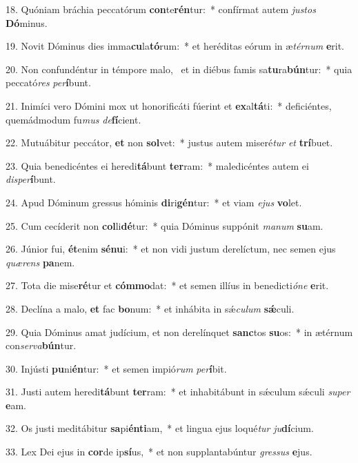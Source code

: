 18. Quóniam bráchia peccatórum \textbf{con}te\textbf{rén}tur:~*  confírmat autem \textit{jus}\textit{tos} \textbf{Dó}minus.\

19. Novit Dóminus dies imma\textbf{cu}la\textbf{tó}rum:~*  et heréditas eórum in æ\textit{tér}\textit{num} \textbf{e}rit.\

20. Non confundéntur in témpore malo, \dag\  et in diébus famis sa\textbf{tu}ra\textbf{bún}tur:~*  quia peccató\textit{res} \textit{per}\textbf{í}bunt.\

21. Inimíci vero Dómini mox ut honorificáti fúerint et \textbf{ex}al\textbf{tá}ti:~*  deficiéntes, quemádmodum fu\textit{mus} \textit{de}\textbf{fí}cient.\

22. Mutuábitur peccátor, \textbf{et} non \textbf{sol}vet:~*  justus autem miseré\textit{tur} \textit{et} \textbf{trí}buet.\

23. Quia benedicéntes ei heredi\textbf{tá}bunt \textbf{ter}ram:~*  maledicéntes autem ei \textit{dis}\textit{per}\textbf{í}bunt.\

24. Apud Dóminum gressus hóminis \textbf{di}ri\textbf{gén}tur:~*  et viam \textit{e}\textit{jus} \textbf{vo}let.\

25. Cum cecíderit non \textbf{col}li\textbf{dé}tur:~*  quia Dóminus suppónit \textit{ma}\textit{num} \textbf{su}am.\

26. Júnior fui, \textbf{ét}enim \textbf{sé}\textbf{nu}i:~*  et non vidi justum derelíctum, nec semen ejus \textit{quæ}\textit{rens} \textbf{pa}nem.\

27. Tota die mise\textbf{ré}tur et \textbf{cóm}\textbf{mo}dat:~*  et semen illíus in benedicti\textit{ó}\textit{ne} \textbf{e}rit.\

28. Declína a malo, \textbf{et} fac \textbf{bo}num:~*  et inhábita in sǽ\textit{cu}\textit{lum} \textbf{sǽ}culi.\

29. Quia Dóminus amat judícium, et non derelínquet \textbf{sanc}tos \textbf{su}os:~*  in ætérnum con\textit{ser}\textit{va}\textbf{bún}tur.\

30. Injústi \textbf{pu}ni\textbf{én}tur:~*  et semen impió\textit{rum} \textit{per}\textbf{í}bit.\

31. Justi autem heredi\textbf{tá}bunt \textbf{ter}ram:~*  et inhabitábunt in sǽculum sǽculi \textit{su}\textit{per} \textbf{e}am.\

32. Os justi meditábitur \textbf{sa}pi\textbf{én}\textbf{ti}am,~*  et lingua ejus loqué\textit{tur} \textit{ju}\textbf{dí}cium.\

33. Lex Dei ejus in \textbf{cor}de ip\textbf{sí}us,~*  et non supplantabúntur \textit{gres}\textit{sus} \textbf{e}jus.\

